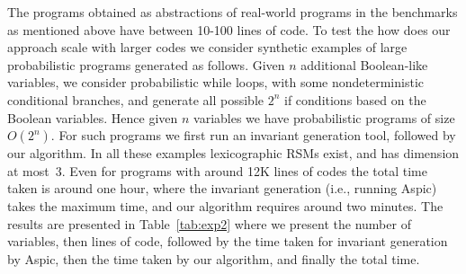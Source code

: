 \smallskip{} 
The programs obtained as abstractions of real-world programs in the benchmarks 
as mentioned above have between 10-100 lines of code. 
To test the how does our approach scale with larger codes we consider synthetic examples 
of large probabilistic programs generated as follows.
Given $n$ additional Boolean-like variables, we consider probabilistic while loops,
with some nondeterministic conditional branches, and generate all possible $2^n$ if conditions
based on the Boolean variables. 
Hence given $n$ variables we have probabilistic programs of size $O(2^n)$.
For such programs we first run an invariant generation tool, followed by our algorithm.
In all these examples lexicographic RSMs exist, and has dimension at most~3.
Even for programs with around 12K lines of codes the total time taken is around 
one hour, where the invariant generation (i.e., running Aspic) takes the maximum time, 
and our algorithm requires around two minutes.
The results are presented in Table~\ref{tab:exp2} where we present the number of 
variables, then lines of code, followed by the time taken for invariant generation
by Aspic, then the time taken by our algorithm, and finally the total time.






